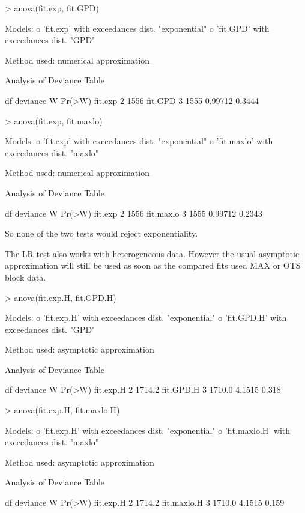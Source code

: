 \documentclass[a4paper]{report}
\begin{document}
\begin{Schunk}
\begin{Sinput}
> anova(fit.exp, fit.GPD)
\end{Sinput}
\begin{Soutput}
Models: 
  o 'fit.exp' with exceedances dist. "exponential"
  o 'fit.GPD' with exceedances dist. "GPD"

Method used:  numerical approximation 

Analysis of Deviance Table

        df deviance       W Pr(>W)
fit.exp  2     1556               
fit.GPD  3     1555 0.99712 0.3444
\end{Soutput}
\begin{Sinput}
> anova(fit.exp, fit.maxlo)
\end{Sinput}
\begin{Soutput}
Models: 
  o 'fit.exp' with exceedances dist. "exponential"
  o 'fit.maxlo' with exceedances dist. "maxlo"

Method used:  numerical approximation 

Analysis of Deviance Table

          df deviance       W Pr(>W)
fit.exp    2     1556               
fit.maxlo  3     1555 0.99712 0.2343
\end{Soutput}
\end{Schunk}

\noindent
So none of the two tests would reject exponentiality.

The LR test also works with heterogeneous data. However the usual
asymptotic approximation will still be used as soon as the compared
fits used MAX or OTS block data. 

\begin{Schunk}
\begin{Sinput}
> anova(fit.exp.H, fit.GPD.H)
\end{Sinput}
\begin{Soutput}
Models: 
  o 'fit.exp.H' with exceedances dist. "exponential"
  o 'fit.GPD.H' with exceedances dist. "GPD"

Method used:  asymptotic approximation 

Analysis of Deviance Table

          df deviance      W Pr(>W)
fit.exp.H  2   1714.2              
fit.GPD.H  3   1710.0 4.1515  0.318
\end{Soutput}
\begin{Sinput}
> anova(fit.exp.H, fit.maxlo.H)
\end{Sinput}
\begin{Soutput}
Models: 
  o 'fit.exp.H' with exceedances dist. "exponential"
  o 'fit.maxlo.H' with exceedances dist. "maxlo"

Method used:  asymptotic approximation 

Analysis of Deviance Table

            df deviance      W Pr(>W)
fit.exp.H    2   1714.2              
fit.maxlo.H  3   1710.0 4.1515  0.159
\end{Soutput}
\end{Schunk}
\end{document}
